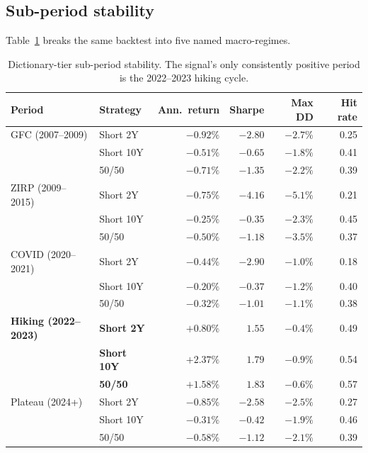\documentclass[11pt]{article}
\begin{document}
\subsection{Sub-period stability}

Table~\ref{tab:subperiods} breaks the same backtest into five named
macro-regimes.

\begin{table}[H]
\centering
\small
\begin{tabular}{llrrrr}
\toprule
Period & Strategy & Ann.\ return & Sharpe & Max DD & Hit rate \\
\midrule
GFC (2007--2009)         & Short 2Y  & $-0.92\%$ & $-2.80$ & $-2.7\%$  & 0.25 \\
                         & Short 10Y & $-0.51\%$ & $-0.65$ & $-1.8\%$  & 0.41 \\
                         & 50/50     & $-0.71\%$ & $-1.35$ & $-2.2\%$  & 0.39 \\
ZIRP (2009--2015)        & Short 2Y  & $-0.75\%$ & $-4.16$ & $-5.1\%$  & 0.21 \\
                         & Short 10Y & $-0.25\%$ & $-0.35$ & $-2.3\%$  & 0.45 \\
                         & 50/50     & $-0.50\%$ & $-1.18$ & $-3.5\%$  & 0.37 \\
COVID (2020--2021)       & Short 2Y  & $-0.44\%$ & $-2.90$ & $-1.0\%$  & 0.18 \\
                         & Short 10Y & $-0.20\%$ & $-0.37$ & $-1.2\%$  & 0.40 \\
                         & 50/50     & $-0.32\%$ & $-1.01$ & $-1.1\%$  & 0.38 \\
\textbf{Hiking (2022--2023)} & \textbf{Short 2Y}  & $\mathbf{+0.80\%}$ & $\mathbf{1.55}$ & $-0.4\%$ & 0.49 \\
                         & \textbf{Short 10Y} & $\mathbf{+2.37\%}$ & $\mathbf{1.79}$ & $-0.9\%$  & 0.54 \\
                         & \textbf{50/50}     & $\mathbf{+1.58\%}$ & $\mathbf{1.83}$ & $-0.6\%$  & 0.57 \\
Plateau (2024+)          & Short 2Y  & $-0.85\%$ & $-2.58$ & $-2.5\%$  & 0.27 \\
                         & Short 10Y & $-0.31\%$ & $-0.42$ & $-1.9\%$  & 0.46 \\
                         & 50/50     & $-0.58\%$ & $-1.12$ & $-2.1\%$  & 0.39 \\
\bottomrule
\end{tabular}
\caption{Dictionary-tier sub-period stability. The signal's only
consistently positive period is the 2022--2023 hiking cycle.}
\label{tab:subperiods}
\end{table}
\end{document}
